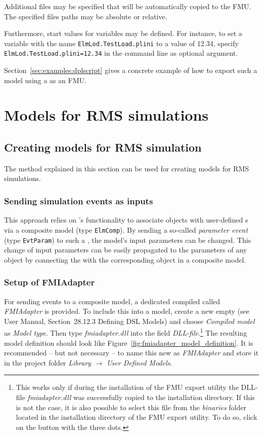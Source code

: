 Additional files may be specified that will be automatically copied to the FMU. The specified files paths may be absolute or relative.

Furthermore, start values for variables may be defined. For instance, to set a variable with the name \texttt{ElmLod.TestLoad.plini} to a value of 12.34, specify \texttt{ElmLod.TestLoad.plini=12.34} in the command line as optional argument.

Section~\ref{sec:examples:dplscript} gives a concrete example of how to export such a model using a \dplscript as an FMU.


\newpage


\section{Models for RMS simulations}

\subsection{Creating models for RMS simulation}
\label{sec:export:create_model_rms}

The method explained in this section can be used for creating models for RMS simulations.

\subsubsection*{Sending simulation events as inputs}

This approach relies on \pf's functionality to associate objects with user-defined {\dslmodel}s via a composite model (type \texttt{ElmComp}).
By sending a so-called \emph{parameter event} (type \texttt{EvtParam}) to such a \dslmodel, the model's input parameters can be changed.
This change of input parameters can be easily propagated to the parameters of any object by connecting the \dslmodel with the corresponding object in a composite model.

\subsubsection*{Setup of \dslmodel FMIAdapter}

For sending events to a composite model, a dedicated compiled \dslmodel called \emph{FMIAdapter} is provided.
To include this \dslmodel into a \pf model, create a new empty \dslmodel (see \pf User Manual, Section~28.12.3 Defining DSL Models) and choose \emph{Compiled model}  as \emph{Model type}.
Then type \emph{fmiadapter.dll} into the field \emph{DLL-file}.\footnote{
  This works only if during the installation of the FMU export utility the DLL-file \emph{fmiadapter.dll} was successfully copied to the \pf installation directory.
  If this is not the case, it is also possible to select this file from the \emph{binaries} folder located in the installation directory of the FMU export utility. To do so, click on the button with the three dots.}
The resulting model definition should look like Figure~\ref{fig:fmiadapter_model_definition}.
It is recommended -- but not necessary -- to name this new \dslmodel as \emph{FMIAdapter} and store it in the project folder \emph{Library} $\to$ \emph{User Defined Models}.

